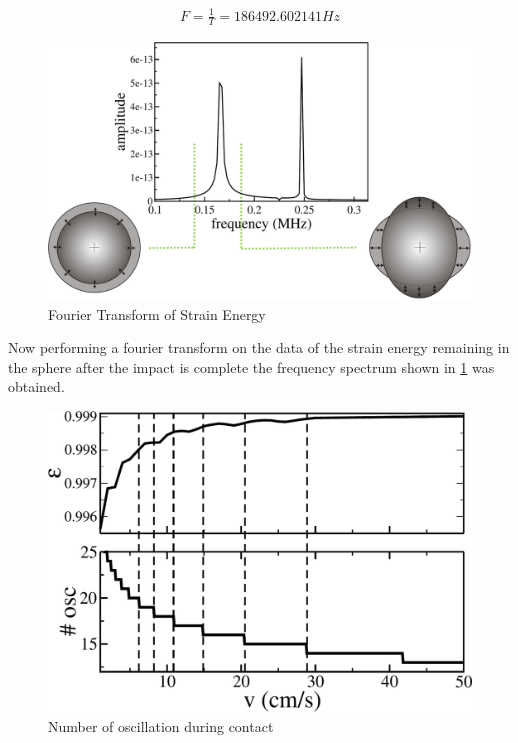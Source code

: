 \begin{align}
F = \frac{1}{T} = 186492.602141Hz
\end{align}

\begin{figure}[H]
\centering
\includegraphics[scale=0.5]{../images/fft/spectrummodes.png}
\caption{Fourier Transform of Strain Energy}
\label{fig:spectrum}
\end{figure}

Now performing a fourier transform on the data of the strain energy remaining in the sphere after the impact is complete the frequency spectrum shown in \ref{fig:spectrum} was obtained.

\begin{figure}[H]
\centering
\includegraphics[scale=0.5]{../images/fft/oscillations.png}
\caption{Number of oscillation during contact}
\label{fig:oscillations}
\end{figure}

